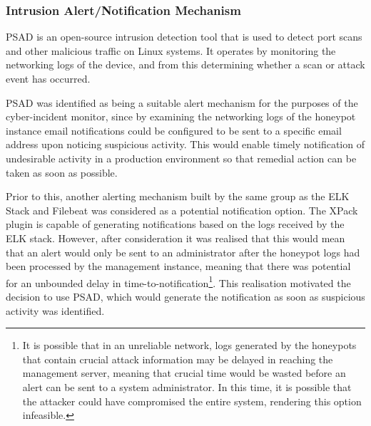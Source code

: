  
\subsubsection{Intrusion Alert/Notification Mechanism} \label{DesignChoicePSAD}
PSAD is an open-source intrusion detection tool that is used to detect port scans and other malicious traffic on Linux systems. It operates by monitoring the networking logs of the device, and from this determining whether a scan or attack event has occurred. 

PSAD was identified as being a suitable alert mechanism for the purposes of the cyber-incident monitor, since by examining the networking logs of the honeypot instance email notifications could be configured to be sent to a specific email address upon noticing suspicious activity. This would enable timely notification of undesirable activity in a production environment so that remedial action can be taken as soon as possible.

Prior to this, another alerting mechanism built by the same group as the ELK Stack and Filebeat was considered as a potential notification option. The XPack plugin is capable of generating notifications based on the logs received by the ELK stack. \cite{Xpack} However, after consideration it was realised that this would mean that an alert would only be sent to an administrator after the honeypot logs had been processed by the management instance, meaning that there was potential for an unbounded delay in time-to-notification\footnote{It is possible that in an unreliable network, logs generated by the honeypots that contain crucial attack information may be delayed in reaching the management server, meaning that crucial time would be wasted before an alert can be sent to a system administrator. In this time, it is possible that the attacker could have compromised the entire system, rendering this option infeasible.}. This realisation motivated the decision to use PSAD, which would generate the notification as soon as suspicious activity was identified.

		


